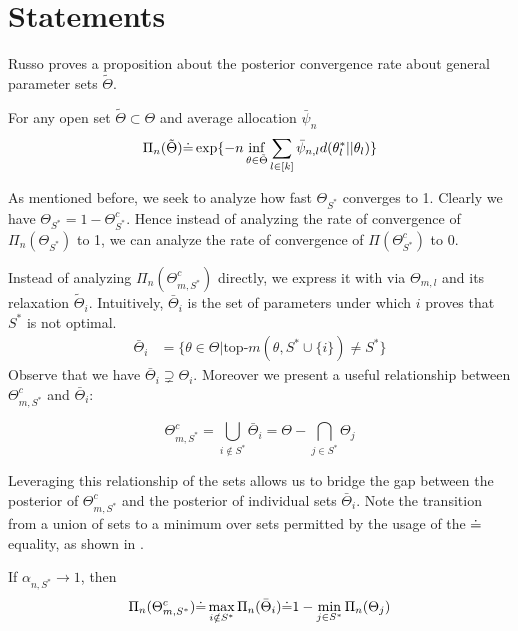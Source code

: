 \section{Statements}\label{section:optimal_statements}
Russo proves a proposition about the posterior convergence rate about general parameter sets $\tilde{\Theta}$.

\begin{proposition}\label{proposition:prop5}
  For any open set $\tilde{\Theta} \subset \Theta$ and average allocation $\bar{\psi}_n$
  \[\Pi_n(\tilde{\Theta}) \dot{=} \exp\{-n \inf_{\theta \in \tilde{\Theta}} \sum_{l \in [k]} \bar{\psi}_{n, l} d(\theta^*_l || \theta_l)\}\]
\end{proposition}

As mentioned before, we seek to analyze how fast $\Theta_{S^*}$ converges to 1. Clearly we have $\Theta_{S^*} = 1 - \Theta_{S^*}^c$. Hence instead of analyzing the rate of convergence of $\Pi_n(\Theta_{S^*})$ to 1, we can analyze the rate of convergence of $\Pi(\Theta_{S^*}^c)$ to 0.

Instead of analyzing $\Pi_n(\Theta_{m, S^*}^c)$ directly, we express it with via $\Theta_{m, l}$ and its relaxation $\tilde{\Theta}_i$. Intuitively, $\bar{\Theta}_i$ is the set of parameters under which $i$ proves that $S^*$ is not optimal.
\begin{align}
    \bar{\Theta}_i &= \{ \theta \in \Theta | \text{top-}m(\theta, S^* \cup \{i\}) \neq S^*\}
\end{align}
Observe that we have $\bar{\Theta}_i \supsetneq \Theta_i$. Moreover we present a useful relationship between $\Theta_{m, S^*}^c$ and $\bar{\Theta}_i$:
\begin{lemma}\label{lemma:set_relation_S*_i}
  \[\Theta_{m, S^*}^c = \bigcup_{i \notin S^*} \bar{\Theta}_i = \Theta - \bigcap_{j \in S^*} \Theta_j\]
\end{lemma}
Leveraging this relationship of the sets allows us to bridge the gap between the posterior of $\Theta_{m, S^*}^c$ and the posterior of individual sets $\bar{\Theta}_i$. Note the transition from a union of sets to a minimum over sets permitted by the usage of the $\dot{=}$ equality, as shown in .
\begin{lemma}\label{lemma:posterior_S*_i} If $\alpha_{n, S^*} \rightarrow 1$, then
  \begin{align}
    \Pi_n(\Theta_{m, S^*}^c) \dot{=} \max_{i \notin S^*} \Pi_n(\bar{\Theta}_i) \dot{=} 1 - \min_{j \in S^*} \Pi_n(\Theta_j)
  \end{align}
\end{lemma}

